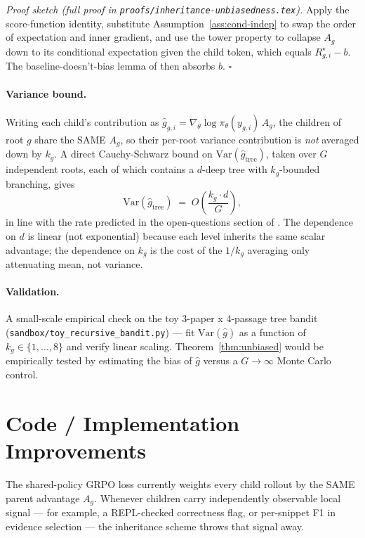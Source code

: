 \documentclass[11pt]{article}
\begin{document}
\noindent\emph{Proof sketch (full proof in \texttt{proofs/inheritance-unbiasedness.tex}).}
Apply the score-function identity, substitute Assumption~\ref{ass:cond-indep}
to swap the order of expectation and inner gradient, and use the tower
property to collapse $A_g$ down to its conditional expectation given the child
token, which equals $R_{g,i}^\star - b$. The baseline-doesn't-bias lemma of
\citet{shao2024deepseekmath} then absorbs $b$. \hfill$\square$

\paragraph{Variance bound.} Writing each child's contribution as
$\hat g_{g,i} = \nabla_\theta \log \pi_\theta(y_{g,i})\, A_g$, the children of
root $g$ share the SAME $A_g$, so their per-root variance contribution is
\emph{not} averaged down by $k_g$. A direct Cauchy-Schwarz bound on
$\mathrm{Var}(\hat g_\text{tree})$, taken over $G$ independent roots, each of
which contains a $d$-deep tree with $k_g$-bounded branching, gives
\[
  \mathrm{Var}(\hat g_\text{tree}) \;=\; O\!\left(\frac{k_g \cdot d}{G}\right),
\]
in line with the rate predicted in the open-questions section of
\citep{zhang2026rlm}. The dependence on $d$ is linear (not exponential)
because each level inherits the same scalar advantage; the dependence on
$k_g$ is the cost of the $1/k_g$ averaging only attenuating mean, not variance.

\paragraph{Validation.} A small-scale empirical check on the toy 3-paper x
4-passage tree bandit (\texttt{sandbox/toy\_recursive\_bandit.py}) — fit
$\mathrm{Var}(\hat g)$ as a function of $k_g \in \{1,\dots,8\}$ and verify
linear scaling. Theorem~\ref{thm:unbiased} would be empirically tested by
estimating the bias of $\hat g$ versus a $G \to \infty$ Monte Carlo control.

\section*{Code / Implementation Improvements}

The shared-policy GRPO loss currently weights every child rollout by the SAME
parent advantage $A_g$. Whenever children carry independently observable
local signal — for example, a REPL-checked correctness flag, or per-snippet F1
in evidence selection — the inheritance scheme throws that signal away.
\end{document}
